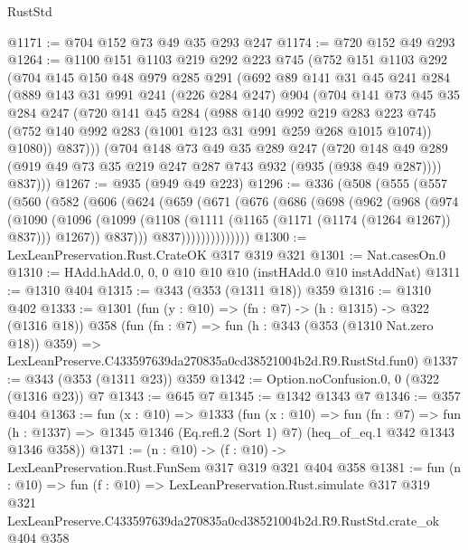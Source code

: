 \begin{lexlean}{RustStd}
\begin{coremodule}
@1171 := @704 @152 @73 @49 @35 @293 @247
@1174 := @720 @152 @49 @293
@1264 := @1100
    @151
    @1103
    @219
    @292
    @223
    @745
    (@752
      @151
      @1103
      @292
      (@704
        @145
        @150
        @48
        @979
        @285
        @291
        (@692
          @89
          @141
          @31
          @45
          @241
          @284
          (@889
            @143
            @31
            @991
            @241
            (@226 @284 @247)
            @904
            (@704
              @141
              @73
              @45
              @35
              @284
              @247
              (@720
                @141
                @45
                @284
                (@988
                  @140
                  @992
                  @219
                  @283
                  @223
                  @745
                  (@752 @140 @992 @283 (@1001 @123 @31 @991 @259 @268 @1015 @1074))
                  @1080))
              @837)))
        (@704
          @148
          @73
          @49
          @35
          @289
          @247
          (@720 @148 @49 @289 (@919 @49 @73 @35 @219 @247 @287 @743 @932 (@935 (@938 @49 @287))))
          @837)))
@1267 := @935 (@949 @49 @223)
@1296 := @336
    (@508
      (@555
        (@557
          (@560
            (@582
              (@606
                (@624
                  (@659
                    (@671
                      (@676
                        (@686
                          (@698
                            (@962
                              (@968
                                (@974
                                  (@1090
                                    (@1096
                                      (@1099
                                        (@1108
                                          (@1111 (@1165 (@1171 (@1174 (@1264 @1267)) @837)))
                                          @1267))
                                      @837)))
                                @837))))))))))))))
@1300 := LexLeanPreservation.Rust.CrateOK @317 @319 @321
@1301 := Nat.casesOn.{0}
@1310 := HAdd.hAdd.{0, 0, 0} @10 @10 @10 (instHAdd.{0} @10 instAddNat)
@1311 := @1310 @404
@1315 := @343 (@353 (@1311 @18)) @359
@1316 := @1310 @402
@1333 := @1301
    (fun (y : @10) => (fn : @7) -> (h : @1315) -> @322 (@1316 @18))
    @358
    (fun (fn : @7) =>
    fun (h : @343 (@353 (@1310 Nat.zero @18)) @359) =>
    LexLeanPreserve.C433597639da270835a0cd38521004b2d.R9.RustStd.fun0)
@1337 := @343 (@353 (@1311 @23)) @359
@1342 := Option.noConfusion.{0, 0} (@322 (@1316 @23)) @7
@1343 := @645 @7
@1345 := @1342 @1343 @7
@1346 := @357 @404
@1363 := fun (x : @10) =>
  @1333
    (fun (x : @10) =>
    fun (fn : @7) =>
    fun (h : @1337) => @1345 @1346 (Eq.refl.{2} (Sort 1) @7) (heq_of_eq.{1} @342 @1343 @1346 @358))
@1371 := (n : @10) -> (f : @10) -> LexLeanPreservation.Rust.FunSem @317 @319 @321 @404 @358
@1381 := fun (n : @10) =>
  fun (f : @10) =>
  LexLeanPreservation.Rust.simulate
    @317
    @319
    @321
    LexLeanPreserve.C433597639da270835a0cd38521004b2d.R9.RustStd.crate_ok
    @404
    @358
\end{coremodule}
\end{lexlean}
